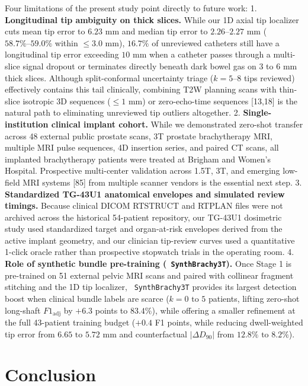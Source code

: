 \documentclass[
  11pt,
]{article}
\let\nforigtexttt\texttt
\renewcommand{\texttt}[1]{\nforigtexttt{\XeTeXinterchartokenstate=1 #1}}
\begin{document}
Four limitations of the present study point directly to future work: 1.
\textbf{Longitudinal tip ambiguity on thick slices.} While our 1D axial
tip localizer cuts mean tip error to \(6.23\text{ mm}\) and median tip
error to \(2.26\text{--}2.27\text{ mm}\) (\(58.7\%\text{--}59.0\%\)
within \(\le 3.0\text{ mm}\)), \(16.7\%\) of unreviewed catheters still
have a longitudinal tip error exceeding \(10\text{ mm}\) when a catheter
passes through a multi-slice signal dropout or terminates directly
beneath dark bowel gas on 3 to 6 mm thick slices. Although
split-conformal uncertainty triage (\(k = 5\text{--}8\) tips reviewed)
effectively contains this tail clinically, combining T2W planning scans
with thin-slice isotropic 3D sequences (\(\le 1\text{ mm}\)) or
zero-echo-time sequences {[}13,18{]} is the natural path to eliminating
unreviewed tip outliers altogether. 2. \textbf{Single-institution
clinical implant cohort.} While we demonstrated zero-shot transfer
across 48 external public prostate scans, 3T prostate brachytherapy MRI,
multiple MRI pulse sequences, 4D insertion series, and paired CT scans,
all implanted brachytherapy patients were treated at Brigham and Women's
Hospital. Prospective multi-center validation across 1.5T, 3T, and
emerging low-field MRI systems {[}85{]} from multiple scanner vendors is
the essential next step. 3. \textbf{Standardized TG-43U1 anatomical
envelopes and simulated review timings.} Because clinical DICOM RTSTRUCT
and RTPLAN files were not archived across the historical 54-patient
repository, our TG-43U1 dosimetric study used standardized target and
organ-at-risk envelopes derived from the active implant geometry, and
our clinician tip-review curves used a quantitative 1-click oracle
rather than prospective stopwatch trials in the operating room. 4.
\textbf{Role of synthetic bundle pre-training (\texttt{SynthBrachy3T}).}
Once Stage 1 is pre-trained on 51 external pelvic MRI scans and paired
with collinear fragment stitching and the 1D tip localizer,
\texttt{SynthBrachy3T} provides its largest detection boost when
clinical bundle labels are scarce (\(k = 0\text{ to }5\) patients,
lifting zero-shot long-shaft \(F1_{\text{adj}}\) by \(+6.3\) points to
\(83.4\%\)), while offering a smaller refinement at the full 43-patient
training budget (\(+0.4\) F1 points, while reducing dwell-weighted tip
error from \(6.65\text{ to }5.72\text{ mm}\) and counterfactual
\(|\Delta D_{90}|\) from \(12.8\%\text{ to }8.2\%\)).

\FloatBarrier

\section{Conclusion}\label{conclusion}
\end{document}
